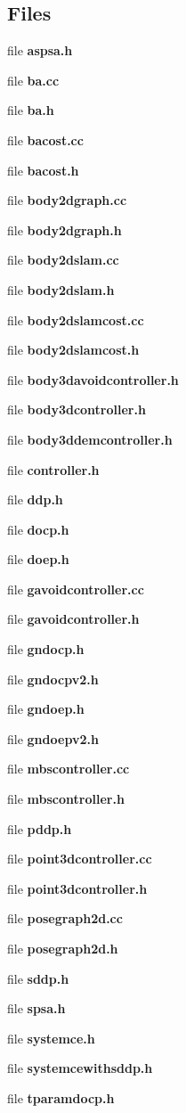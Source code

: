 \subsection*{\-Files}
\begin{DoxyCompactItemize}
\item 
file {\bf aspsa.\-h}
\item 
file {\bf ba.\-cc}
\item 
file {\bf ba.\-h}
\item 
file {\bf bacost.\-cc}
\item 
file {\bf bacost.\-h}
\item 
file {\bf body2dgraph.\-cc}
\item 
file {\bf body2dgraph.\-h}
\item 
file {\bf body2dslam.\-cc}
\item 
file {\bf body2dslam.\-h}
\item 
file {\bf body2dslamcost.\-cc}
\item 
file {\bf body2dslamcost.\-h}
\item 
file {\bf body3davoidcontroller.\-h}
\item 
file {\bf body3dcontroller.\-h}
\item 
file {\bf body3ddemcontroller.\-h}
\item 
file {\bf controller.\-h}
\item 
file {\bf ddp.\-h}
\item 
file {\bf docp.\-h}
\item 
file {\bf doep.\-h}
\item 
file {\bf gavoidcontroller.\-cc}
\item 
file {\bf gavoidcontroller.\-h}
\item 
file {\bf gndocp.\-h}
\item 
file {\bf gndocpv2.\-h}
\item 
file {\bf gndoep.\-h}
\item 
file {\bf gndoepv2.\-h}
\item 
file {\bf mbscontroller.\-cc}
\item 
file {\bf mbscontroller.\-h}
\item 
file {\bf pddp.\-h}
\item 
file {\bf point3dcontroller.\-cc}
\item 
file {\bf point3dcontroller.\-h}
\item 
file {\bf posegraph2d.\-cc}
\item 
file {\bf posegraph2d.\-h}
\item 
file {\bf sddp.\-h}
\item 
file {\bf spsa.\-h}
\item 
file {\bf systemce.\-h}
\item 
file {\bf systemcewithsddp.\-h}
\item 
file {\bf tparamdocp.\-h}
\end{DoxyCompactItemize}
